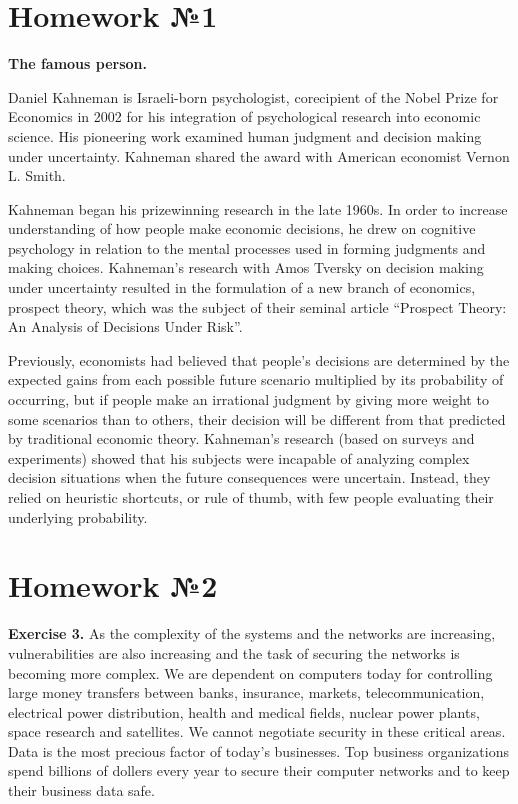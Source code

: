 \documentclass[a4paper,12pt]{article}
\begin{document}
\pagestyle{fancy}

\section{Homework №1}

\textbf{The famous person.}

Daniel Kahneman is  Israeli-born psychologist, corecipient of the Nobel Prize for Economics in 2002 for his integration of psychological research into economic science. His pioneering work examined human judgment and decision making under uncertainty. Kahneman shared the award with American economist Vernon L. Smith.

Kahneman began his prizewinning research in the late 1960s. In order to increase understanding of how people make economic decisions, he drew on cognitive psychology in relation to the mental processes used in forming judgments and making choices. Kahneman’s research with Amos Tversky on decision making under uncertainty resulted in the formulation of a new branch of economics, prospect theory, which was the subject of their seminal article “Prospect Theory: An Analysis of Decisions Under Risk”. 

Previously, economists had believed that people’s decisions are determined by the expected gains from each possible future scenario multiplied by its probability of occurring, but if people make an irrational judgment by giving more weight to some scenarios than to others, their decision will be different from that predicted by traditional economic theory. Kahneman’s research (based on surveys and experiments) showed that his subjects were incapable of analyzing complex decision situations when the future consequences were uncertain. Instead, they relied on heuristic shortcuts, or rule of thumb, with few people evaluating their underlying probability.

\section{Homework №2}

\textbf{Exercise 3.}
As the complexity of the systems and the networks are increasing, vulnerabilities are also increasing and the task of securing the networks is becoming more complex. We are dependent on computers today for controlling large money transfers between banks, insurance, markets, telecommunication, electrical power distribution, health and medical fields, nuclear power plants, space research and satellites. We cannot negotiate security in these critical areas. Data is the most precious factor of today’s businesses. Top business organizations spend billions of dollers every year to secure their computer networks and to keep their business data safe. 
\end{document}
